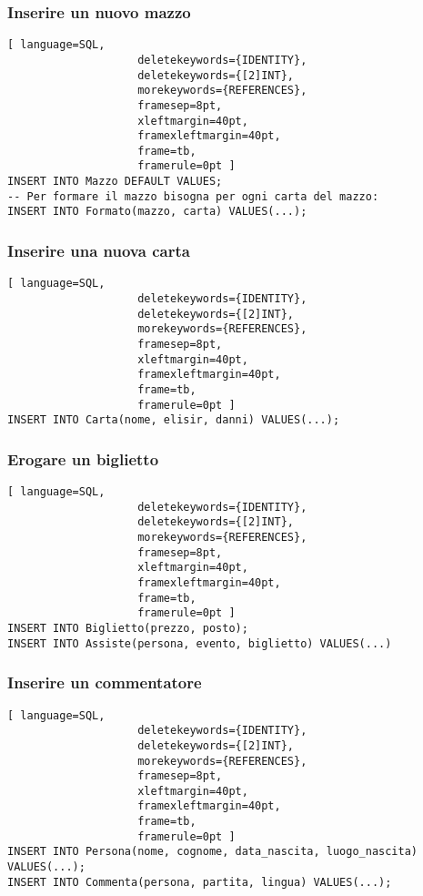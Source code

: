 \documentclass{article}
\begin{document}
\subsubsection{Inserire un nuovo mazzo}
\begin{lstlisting}[ language=SQL,
                    deletekeywords={IDENTITY},
                    deletekeywords={[2]INT},
                    morekeywords={REFERENCES},
                    framesep=8pt,
                    xleftmargin=40pt,
                    framexleftmargin=40pt,
                    frame=tb,
                    framerule=0pt ]
INSERT INTO Mazzo DEFAULT VALUES;
-- Per formare il mazzo bisogna per ogni carta del mazzo:
INSERT INTO Formato(mazzo, carta) VALUES(...);
\end{lstlisting}

\subsubsection{Inserire una nuova carta}
\begin{lstlisting}[ language=SQL,
                    deletekeywords={IDENTITY},
                    deletekeywords={[2]INT},
                    morekeywords={REFERENCES},
                    framesep=8pt,
                    xleftmargin=40pt,
                    framexleftmargin=40pt,
                    frame=tb,
                    framerule=0pt ]
INSERT INTO Carta(nome, elisir, danni) VALUES(...);
\end{lstlisting}

\subsubsection{Erogare un biglietto}
\begin{lstlisting}[ language=SQL,
                    deletekeywords={IDENTITY},
                    deletekeywords={[2]INT},
                    morekeywords={REFERENCES},
                    framesep=8pt,
                    xleftmargin=40pt,
                    framexleftmargin=40pt,
                    frame=tb,
                    framerule=0pt ]
INSERT INTO Biglietto(prezzo, posto);
INSERT INTO Assiste(persona, evento, biglietto) VALUES(...)
\end{lstlisting}

\subsubsection{Inserire un commentatore}
\begin{lstlisting}[ language=SQL,
                    deletekeywords={IDENTITY},
                    deletekeywords={[2]INT},
                    morekeywords={REFERENCES},
                    framesep=8pt,
                    xleftmargin=40pt,
                    framexleftmargin=40pt,
                    frame=tb,
                    framerule=0pt ]
INSERT INTO Persona(nome, cognome, data_nascita, luogo_nascita) VALUES(...);
INSERT INTO Commenta(persona, partita, lingua) VALUES(...);
\end{lstlisting}
\end{document}
